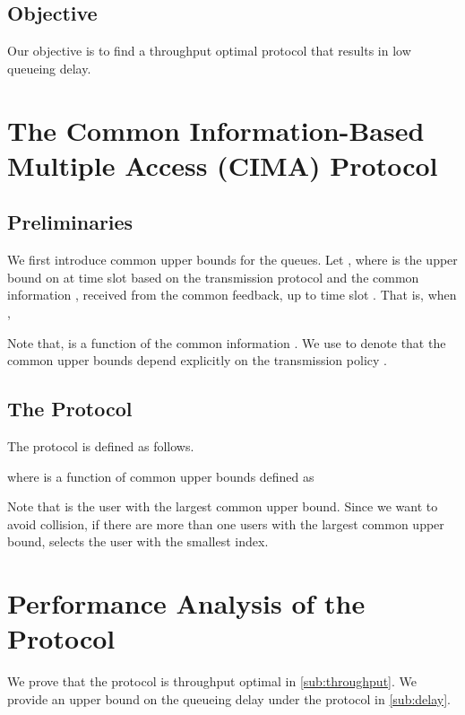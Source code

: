 \documentclass[onecolumn,draftcls]{IEEEtran}
\begin{document}
\subsection{Objective}
Our objective is to find a throughput optimal protocol that results in low queueing delay.


\section{The Common Information-Based Multiple Access (CIMA) Protocol}
\label{sec:CIMA}
\subsection{Preliminaries}
We first introduce common upper bounds for the queues.
Let , where
 is the upper bound on  at time slot  based on the transmission protocol  and the common information , received from the common feedback, up to time slot .
That is, when ,

Note that,  is a function of the common information . We use  to denote that the common upper bounds depend explicitly on the transmission policy .

\subsection{The  Protocol}
\label{sub:ghat}
The  protocol is defined as follows.

where  is a function of common upper bounds  defined as

Note that  is the user with the largest common upper bound. Since we want to avoid collision, if there are more than one users with the largest common upper bound,  selects the user with the smallest index.



\section{Performance Analysis of the  Protocol}
\label{sec:analysis}
We prove that the  protocol is throughput optimal in \ref{sub:throughput}.
We provide an upper bound on the queueing delay under the  protocol in \ref{sub:delay}.
\end{document}

